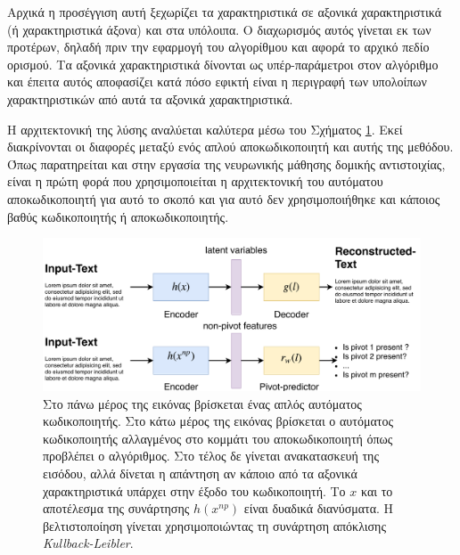 Αρχικά η προσέγγιση αυτή ξεχωρίζει τα χαρακτηριστικά σε αξονικά χαρακτηριστικά (ή χαρακτηριστικά άξονα) και στα υπόλοιπα. Ο διαχωρισμός αυτός γίνεται εκ των προτέρων, δηλαδή πριν την εφαρμογή του αλγορίθμου και αφορά το αρχικό πεδίο ορισμού. Τα αξονικά χαρακτηριστικά δίνονται ως υπέρ-παράμετροι στον αλγόριθμο και έπειτα αυτός αποφασίζει κατά πόσο εφικτή είναι η περιγραφή των υπολοίπων χαρακτηριστικών από αυτά τα αξονικά χαρακτηριστικά. 

Η αρχιτεκτονική της λύσης αναλύεται καλύτερα μέσω του Σχήματος \ref{fig:SCL_autoencoder}. Εκεί διακρίνονται οι διαφορές μεταξύ ενός απλού αποκωδικοποιητή και αυτής της μεθόδου. Όπως παρατηρείται και στην εργασία της νευρωνικής μάθησης δομικής αντιστοιχίας, είναι η πρώτη φορά που χρησιμοποιείται η αρχιτεκτονική του αυτόματου αποκωδικοποιητή για αυτό το σκοπό και για αυτό δεν χρησιμοποιήθηκε και κάποιος βαθύς κωδικοποιητής ή αποκωδικοποιητής.

\begin{figure}[H]
\centering
\includegraphics[width = \textwidth]{figures/transferLearning/SCL_autoencoder.pdf}
\caption[Αρχιτεκτονική νευρωνικής μάθησης δομικής αντιστοιχίας]{Στο πάνω μέρος της εικόνας βρίσκεται ένας απλός αυτόματος κωδικοποιητής. Στο κάτω μέρος της εικόνας βρίσκεται ο αυτόματος κωδικοποιητής αλλαγμένος στο κομμάτι του αποκωδικοποιητή όπως προβλέπει ο αλγόριθμος. Στο τέλος δε γίνεται ανακατασκευή της εισόδου, αλλά δίνεται η απάντηση αν κάποιο από τα αξονικά χαρακτηριστικά υπάρχει στην έξοδο του κωδικοποιητή. Το $x$ και το αποτέλεσμα της συνάρτησης $h(x^{np})$ είναι δυαδικά διανύσματα. Η βελτιστοποίηση γίνεται χρησιμοποιώντας τη συνάρτηση απόκλισης \textit{Kullback-Leibler}.}
\label{fig:SCL_autoencoder}
\end{figure}


